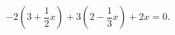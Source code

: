 \begin{ex}[type=equation]
	\begin{condition}
		$-2\left(3+\dfrac{1}{2}x\right)+3\left(2-\dfrac{1}{3}x\right) + 2x = 0.$
	\end{condition}
\end{ex}